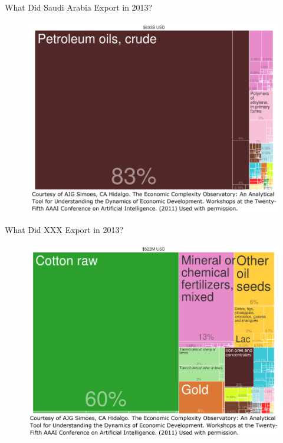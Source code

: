 \documentclass[10pt,hyperref={CJKbookmarks=true},xcolor=dvipsnames,aspectratio=169]{beamer}
\begin{document}
\begin{frame}{What Did Saudi Arabia Export in 2013?}


\begin{figure}
\includegraphics[scale=0.35]{fig/gravity/com2-4.PNG}
\end{figure}

\end{frame}

\begin{frame}{What Did XXX Export in 2013?}


\begin{figure}
\includegraphics[scale=0.35]{fig/gravity/com2-5.PNG}
\end{figure}

\end{frame}
\end{document}

